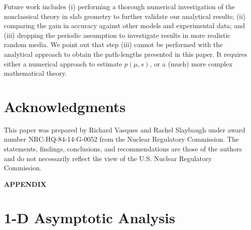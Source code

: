 \documentclass[12pt]{article}
\begin{document}
{Future work includes (i) performing a thorough numerical investigation of the nonclassical theory in slab geometry to further validate our analytical results; (ii) comparing the gain in accuracy against other models and experimental data; and (iii) dropping the periodic assumption to investigate results in more realistic random media.
We point out that step (iii) cannot be performed with the analytical approach to obtain the path-lengths presented in this paper.
It requires either a numerical approach to estimate $p(\mu,s)$, or a (much) more complex mathematical theory.

\section*{Acknowledgments}

This paper was prepared by Richard Vasques and Rachel Slaybaugh under award number NRC-HQ-84-14-G-0052 from the Nuclear Regulatory Commission.
The statements, findings, conclusions, and recommendations are those of the authors and do not necessarily reflect the view of the U.S. Nuclear Regulatory Commission.

\appendix

\begin{center}
\textbf{APPENDIX}
\end{center}

\section{1-D Asymptotic Analysis}\label{appa}

}
\end{document}
